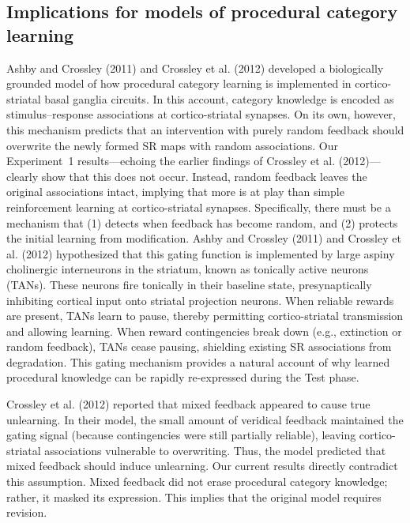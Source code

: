 \documentclass{article}
\begin{document}
\subsection{Implications for models of procedural category learning}
Ashby and Crossley (2011) and Crossley et al. (2012)
developed a biologically grounded model of how procedural
category learning is implemented in cortico-striatal basal
ganglia circuits. In this account, category knowledge is
encoded as stimulus--response associations at
cortico-striatal synapses. On its own, however, this
mechanism predicts that an intervention with purely random
feedback should overwrite the newly formed SR maps with
random associations. Our Experiment~1 results---echoing the
earlier findings of Crossley et al. (2012)---clearly show
that this does not occur. Instead, random feedback leaves
the original associations intact, implying that more is at
play than simple reinforcement learning at
cortico-striatal synapses. Specifically, there must be a
mechanism that (1) detects when feedback has become random,
and (2) protects the initial learning from modification.
Ashby and Crossley (2011) and Crossley et al. (2012)
hypothesized that this gating function is implemented by
large aspiny cholinergic interneurons in the striatum,
known as tonically active neurons (TANs). These neurons fire
tonically in their baseline state, presynaptically inhibiting
cortical input onto striatal projection neurons. When
reliable rewards are present, TANs learn to pause, thereby
permitting cortico-striatal transmission and allowing
learning. When reward contingencies break down (e.g.,
extinction or random feedback), TANs cease pausing,
shielding existing SR associations from degradation. This
gating mechanism provides a natural account of why learned
procedural knowledge can be rapidly re-expressed during the
Test phase.

Crossley et al. (2012) reported that mixed feedback appeared
to cause true unlearning. In their model, the small amount
of veridical feedback maintained the gating signal (because
contingencies were still partially reliable), leaving
cortico-striatal associations vulnerable to overwriting.
Thus, the model predicted that mixed feedback should induce
unlearning. Our current results directly contradict this
assumption. Mixed feedback did not erase procedural category
knowledge; rather, it masked its expression. This implies
that the original model requires revision. 
\end{document}
